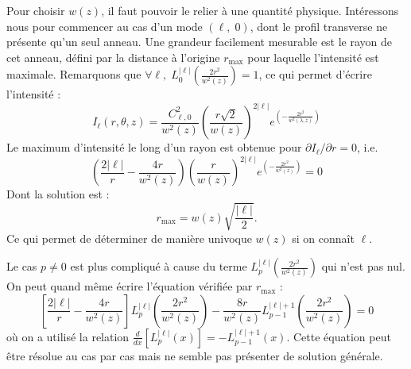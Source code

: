 Pour choisir $w(z)$, il faut pouvoir le relier à une quantité physique. Intéressons nous pour commencer au cas d'un mode $(\ell,\;0)$, dont le profil transverse ne présente qu'un seul anneau. Une grandeur facilement mesurable est le rayon de cet anneau, défini par la distance à l'origine $r_\mathrm{max}$ pour laquelle l'intensité est maximale. Remarquons que $\forall\ell, \;L_0^{\left| \ell  \right|}\left(\frac{2r^2}{w^2(z)}\right) = 1$, ce qui permet d'écrire l'intensité :
\begin{equation*}
{I_\ell }(r,\theta ,z) = \frac{C_{\ell,0}^2}{{{w}^2\left( {z} \right)}}{\left( {\frac{r\sqrt{2}}{{w\left( z \right)}}} \right)^{2\left| \ell  \right|}}{e^{\left( { - \frac{{2{r^2}}}{{{w^2}\left( {\lambda ,z} \right)}}} \right)}}
\end{equation*}
Le maximum d'intensité le long d'un rayon est obtenue pour $\partial {I_\ell }/\partial r = 0$, i.e. 
\begin{equation*}
	\left( {\frac{{2\left| \ell  \right|}}{r} - \frac{{4r}}{{{w^2}\left( z \right)}}} \right){\left( {\frac{r}{{w\left( z \right)}}} \right)^{2\left| \ell  \right|}}{e^{\left( { - \frac{{2{r^2}}}{{{w^2}\left( z \right)}}} \right)}} = 0
\end{equation*}
Dont la solution est :
\begin{equation}
{r_{{\mathrm{max}}}} = w\left( {z} \right)\sqrt {\frac{{\left| \ell  \right|}}{2}}.
\label{Eq:rmax_LG}
\end{equation}
Ce qui permet de déterminer de manière univoque $w(z)$ si on connaît $\ell$.

Le cas $p\neq 0$ est plus compliqué à cause du terme $L_p^{\left| \ell  \right|}\left(\frac{2r^2}{w^2(z)}\right)$ qui n'est pas nul. On peut quand même écrire l'équation vérifiée par $r_\mathrm{max}$ :
\begin{equation*}
 \left[{\frac{{2\left| \ell  \right|}}{r} - \frac{{4r}}{{{w^2}\left( z \right)}}}\right]L_p^{\left| \ell  \right|}\left(\frac{2r^2}{w^2(z)}\right)
	- \frac{8r}{w^2(z)} L_{p-1}^{\left| \ell \right|+1}\left(\frac{2r^2}{w^2(z)}\right)
	= 0
\end{equation*}
où on a utilisé la relation $\frac{d}{dx}\left[L_{p}^{\left| \ell \right|}(x)\right] = -L_{p-1}^{\left| \ell \right|+1}(x)$. Cette équation peut être résolue au cas par cas mais ne semble pas présenter de solution générale.

